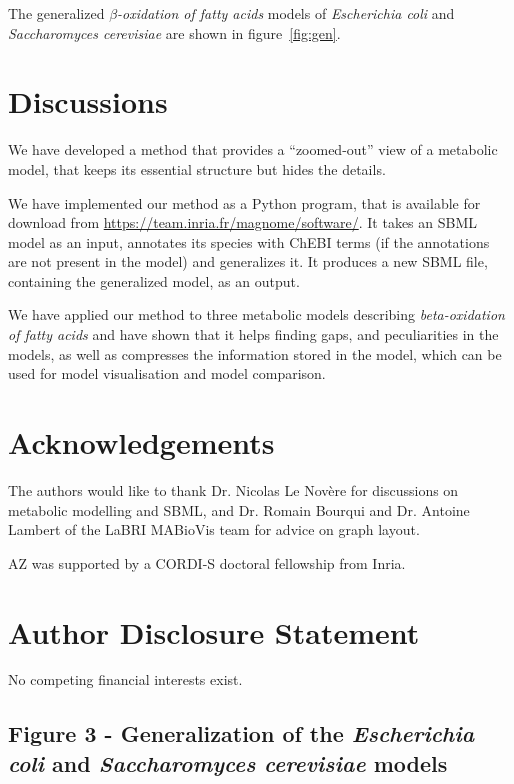 \documentclass[9pt]{article}
\newcounter{fig}
\newcounter{rm}
\begin{document}
The generalized \textit{$\beta$-oxidation of fatty acids} models of \textit{Escherichia coli} and \textit{Saccharomyces cerevisiae} are shown in figure~\ref{fig:gen}.

\newpage
\section*{Discussions}

We have developed a method that provides a ``zoomed-out'' view of a metabolic model, that keeps its essential structure but hides the details. 

We have implemented our method as a Python program, that is available for download from \url{https://team.inria.fr/magnome/software/}. It takes an SBML model as an input, annotates its species with ChEBI terms (if the annotations are not present in the model) and generalizes it. It produces a new SBML file, containing the generalized model, as an output.

We have applied our method to three metabolic models describing \emph{beta-oxidation of fatty acids} and have shown that it helps finding gaps, and peculiarities in the models, as well as compresses the information stored in the model, which can be used for model visualisation and model comparison.

\bigskip

\section*{Acknowledgements}
  The authors would like to thank Dr. Nicolas Le Nov\`{e}re for discussions on metabolic modelling and SBML, and Dr. Romain Bourqui and Dr. Antoine Lambert of the LaBRI MABioVis team for advice on graph layout.
  
  AZ was supported by a CORDI-S doctoral fellowship from Inria.

\section*{Author Disclosure Statement}
No competing financial interests exist.

\newpage
 




\subsection*{Figure 3 - Generalization of the \textit{Escherichia coli} and \textit{Saccharomyces cerevisiae} models}
\end{document}
